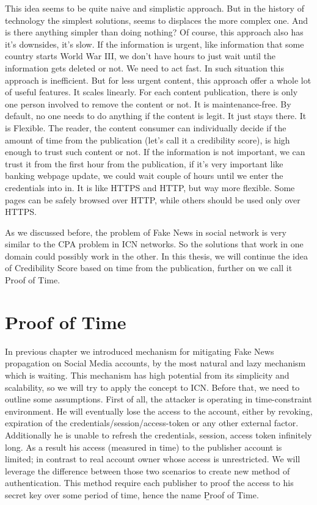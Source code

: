 \documentclass[nostrict]{szablonPG}
\begin{document}
This idea seems to be quite naive and simplistic approach. But  in the history of technology the simplest solutions, seems to displaces the more complex one. And is there anything simpler than doing nothing? 
Of course, this approach also has it's downsides, it's slow. If the information is urgent, like information that some country starts World War III, we don't have hours to just wait until the information gets deleted or not. We need to act fast. In such situation this approach is inefficient. But for less urgent content, this approach offer a whole lot of useful features. It scales linearly. For each content publication, there is only one person involved to remove the content or not. It is maintenance-free. By default, no one needs to do anything if the content is legit. It just stays there. It is Flexible. The reader, the content consumer can individually decide if the amount of time from the publication (let's call it a credibility score), is high enough to trust such content or not. If the information is not important, we can trust it from the first hour from the publication, if it's very important like banking webpage update, we could wait couple of hours until we enter the credentials into in. It is like HTTPS and HTTP, but way more flexible. Some pages can be safely browsed over HTTP, while others should be used only over HTTPS. 

As we discussed before, the problem of Fake News in social network is very similar to the CPA problem in ICN networks. So the solutions that work in one domain could possibly work in the other. In this thesis, we will continue the idea of Credibility Score based on time from the publication, further on we call it Proof of Time.

\section{Proof of Time}
In previous chapter we introduced mechanism for mitigating Fake News propagation on Social Media accounts, by the most natural and lazy mechanism which is waiting. This mechanism has high potential from its simplicity and scalability, so we will try to apply the concept to ICN. Before that, we need to outline some assumptions. First of all, the attacker is operating in time-constraint environment. He will eventually lose the access to the account, either by revoking, expiration of the  credentials/session/access-token or any other external factor. Additionally he is unable to refresh the credentials, session, access token infinitely long. As a result his access (measured in time) to the publisher account is limited; in contrast to real account owner whose access is unrestricted. 
We will leverage the difference between those two scenarios to create new method of authentication. This method require each publisher to proof the access to his secret key over some period of time, hence the name \b{Proof of Time}.
\end{document}
